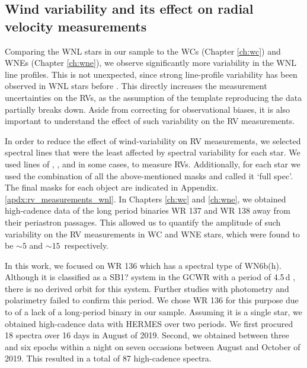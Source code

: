 \subsection{Wind variability and its effect on radial velocity measurements}

Comparing the WNL stars in our sample to the WCs (Chapter \ref{ch:wc}) and WNEs (Chapter \ref{ch:wne}), we observe significantly more variability in the WNL line profiles. This is not unexpected, since strong line-profile variability has been observed in WNL stars before \citep[][]{st-louis_systematic_2009,chene_systematic_2011,2014michaux,2020chene}. This directly increases the measurement uncertainties on the RVs, as the assumption of the template reproducing the data partially breaks down. Aside from correcting for observational biases, it is also important to understand the effect of such variability on the RV measurements. 

In order to reduce the effect of wind-variability on RV measurements, we selected spectral lines that were the least affected by spectral variability for each star. We used lines of \heii{}, \niii{}, \niv{} and in some cases, \nv{} to measure RVs. Additionally, for each star we used the combination of all the above-mentioned masks and called it `full spec'. The final masks for each object are indicated in Appendix. \ref{apdx:rv_measurements_wnl}. In Chapters \ref{ch:wc} and \ref{ch:wne}, we obtained high-cadence data of the long period binaries WR 137 and WR 138 away from their periastron passages. This allowed us to quantify the amplitude of such variability on the RV measurements in WC and WNE stars, which were found to be ${\sim}5$ and ${\sim}15$\,\kms{} respectively.

In this work, we focused on WR 136 which has a spectral type of WN6b(h). Although it is classified as a SB1? system in the GCWR with a period of 4.5\,d \citep{koenigsberger_spectral_1980,aslanov_hd_1981}, there is no derived orbit for this system. Further studies with photometry \citep{moffat_photometric_1986} and polarimetry \citep{robert_polarization_1989} failed to confirm this period. We chose WR 136 for this purpose due to of a lack of a long-period binary in our sample. Assuming it is a single star, we obtained high-cadence data with HERMES over two periods. We first procured 18 spectra over 16 days in August of 2019. Second, we obtained between three and six epochs within a night on seven occasions between August and October of 2019. This resulted in a total of 87 high-cadence spectra.  

